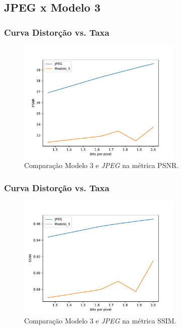 \documentclass{beamer}
\begin{document}
\subsection{JPEG x Modelo 3}
\begin{frame}
\frametitle{Curva Distorção vs. Taxa}
\begin{figure}
\includegraphics[width=0.7\textwidth]{figs/plots_psnr.pdf}
\caption{Comparação Modelo 3 e \textit{JPEG} na métrica PSNR.}
\end{figure}
\end{frame}
\begin{frame}
\frametitle{Curva Distorção vs. Taxa}
\begin{figure}
\includegraphics[width=0.7\textwidth]{figs/plots_ssim.pdf}
\caption{Comparação Modelo 3 e \textit{JPEG} na métrica SSIM.}
\end{figure}
\end{frame}
\end{document}
